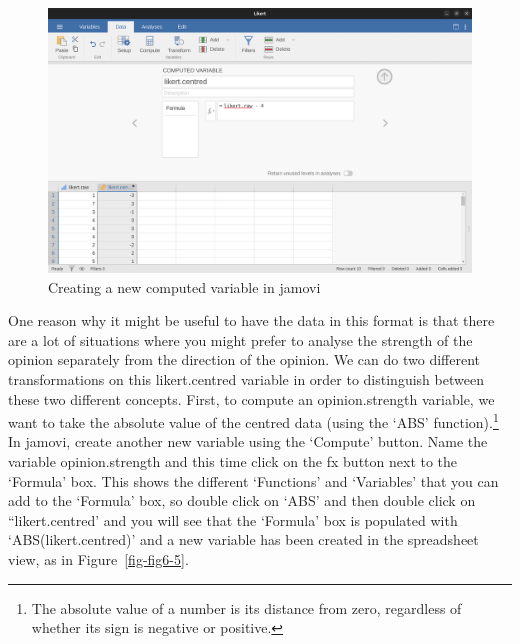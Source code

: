 \documentclass[
  a4paper,
]{book}
\begin{document}
\begin{figure}

\includegraphics[width=1\textwidth,height=\textheight]{images/fig6-4.png} \hfill{}

\caption{\label{fig-fig6-4}Creating a new computed variable in jamovi}

\end{figure}

One reason why it might be useful to have the data in this format is
that there are a lot of situations where you might prefer to analyse the
strength of the opinion separately from the direction of the opinion. We
can do two different transformations on this likert.centred variable in
order to distinguish between these two different concepts. First, to
compute an opinion.strength variable, we want to take the absolute value
of the centred data (using the `ABS' function).\footnote{The absolute
  value of a number is its distance from zero, regardless of whether its
  sign is negative or positive.} In jamovi, create another new variable
using the `Compute' button. Name the variable opinion.strength and this
time click on the fx button next to the `Formula' box. This shows the
different `Functions' and `Variables' that you can add to the `Formula'
box, so double click on `ABS' and then double click on ``likert.centred'
and you will see that the `Formula' box is populated with
`ABS(likert.centred)' and a new variable has been created in the
spreadsheet view, as in Figure~\ref{fig-fig6-5}.
\end{document}
